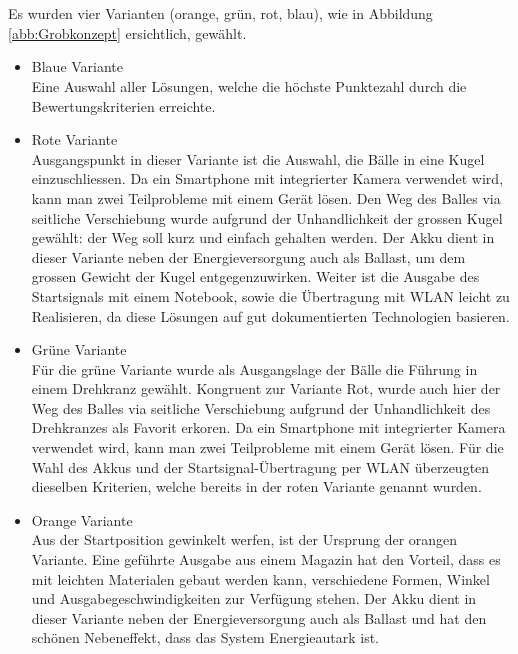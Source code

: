 \\
\\
Es wurden vier Varianten (orange, grün, rot, blau), wie in Abbildung \ref{abb:Grobkonzept} ersichtlich, gewählt. 
\begin{itemize}
	\item Blaue Variante\\
	Eine Auswahl aller Lösungen, welche die höchste Punktezahl durch die Bewertungskriterien erreichte.
	
	\item Rote Variante\\
	Ausgangspunkt in dieser Variante ist die Auswahl, die Bälle in eine Kugel einzuschliessen. Da ein Smartphone mit integrierter Kamera verwendet wird, kann man zwei Teilprobleme mit einem Gerät lösen. Den Weg des Balles via seitliche Verschiebung wurde aufgrund der Unhandlichkeit der grossen Kugel gewählt: der Weg soll kurz und einfach gehalten werden. Der Akku dient in dieser Variante neben der Energieversorgung auch als Ballast, um dem grossen Gewicht der Kugel entgegenzuwirken. Weiter ist die Ausgabe des Startsignals mit einem Notebook, sowie die Übertragung mit WLAN leicht zu Realisieren, da diese Lösungen auf gut dokumentierten Technologien basieren.
	
	\item Grüne Variante\\
	Für die grüne Variante wurde als Ausgangslage der Bälle die Führung in einem Drehkranz gewählt. Kongruent zur Variante Rot, wurde auch hier der Weg des Balles via seitliche Verschiebung aufgrund der Unhandlichkeit des Drehkranzes als Favorit erkoren. Da ein Smartphone mit integrierter Kamera verwendet wird, kann man zwei Teilprobleme mit einem Gerät lösen. Für die Wahl des Akkus und der Startsignal-Übertragung per WLAN überzeugten dieselben Kriterien, welche bereits in der roten Variante genannt wurden.
	
	\item Orange Variante\\
	Aus der Startposition gewinkelt werfen, ist der Ursprung der orangen Variante. Eine geführte Ausgabe aus einem Magazin hat den Vorteil, dass es mit leichten Materialen gebaut werden kann, verschiedene Formen, Winkel und Ausgabegeschwindigkeiten zur Verfügung stehen. Der Akku dient in dieser Variante neben der Energieversorgung auch als Ballast und hat den schönen Nebeneffekt, dass das System Energieautark ist.
\end{itemize}

